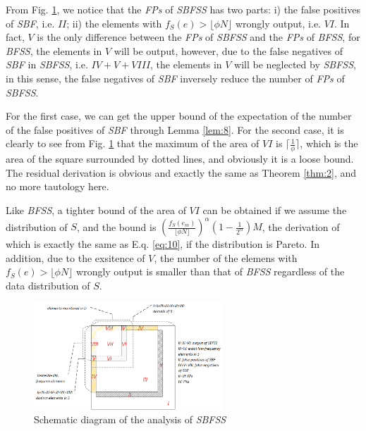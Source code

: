 \documentclass[conference]{IEEEtran}
\begin{document}
\begin{IEEEproof}
From Fig. \ref{fig:sbfss}, we notice that the \emph{FPs} of \emph{SBFSS} has two parts: i) the false positives of \emph{SBF}, i.e. $II$; ii) the elements with $f_S(e)>\lfloor\phi N\rfloor$ wrongly output, i.e. $VI$. In fact, $V$ is the only difference between the \emph{FPs} of \emph{SBFSS} and the \emph{FPs} of \emph{BFSS}, for \emph{BFSS}, the elements in $V$ will be output, however, due to the false negatives of \emph{SBF} in \emph{SBFSS}, i.e. $IV+V+VIII$, the elements in $V$ will be neglected by \emph{SBFSS}, in this sense, the false negatives of \emph{SBF} inversely reduce the number of \emph{FPs} of \emph{SBFSS}. \par
For the first case, we can get the upper bound of the expectation of the number of the false positives of \emph{SBF} through Lemma \ref{lem:8}. For the second case, it is clearly to see from Fig. \ref{fig:sbfss} that the maximum of the area of $VI$ is $\lceil\frac{1}{\phi}\rceil$, which is the area of the square surrounded by dotted lines, and obviously it is a loose bound. The residual derivation is obvious and exactly the same as Theorem \ref{thm:2}, and no more tautology here.
\end{IEEEproof}
Like \emph{BFSS}, a tighter bound of the area of $VI$ can be obtained if we assume the distribution of $S$, and the bound is $(\frac{f_S(e_m)}{\lfloor \phi N\rfloor})^\alpha(1-\frac{1}{2^\alpha})M$, the derivation of which is exactly the same as E.q. \ref{eq:10}, if the distribution is Pareto. In addition, due to the exsitence of $V$, the number of the elemens with $f_S(e)>\lfloor\phi N\rfloor$ wrongly output is smaller than that of \emph{BFSS} regardless of the data distribution of $S$. 
\begin{figure}
	\centering
	\includegraphics[width=2.8in]{png/sbfss.png}
	\caption{Schematic diagram of the analysis of \emph{SBFSS}}
	\label{fig:sbfss}
\end{figure}
\end{document}
